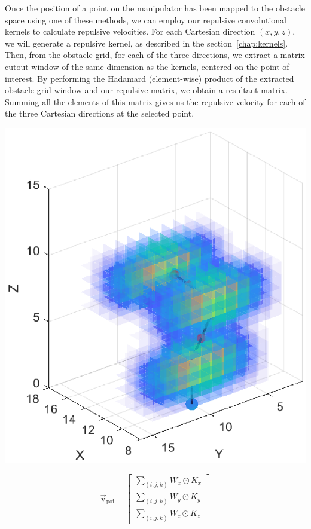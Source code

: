 \documentclass[]{article}
\begin{document}
Once the position of a point on the manipulator has been mapped to the obstacle space using one of these methods, we can employ our repulsive convolutional kernels to calculate repulsive velocities. For each Cartesian direction $(x, y, z)$, we will generate a repulsive kernel, as described in the section~\ref{chap:kernels}. Then, from the obstacle grid, for each of the three directions, we extract a matrix cutout window of the same dimension as the kernels, centered on the point of interest. By performing the Hadamard (element-wise) product of the extracted obstacle grid window and our repulsive matrix, we obtain a resultant matrix. Summing all the elements of this matrix gives us the repulsive velocity for each of the three Cartesian directions at the selected point.

\includegraphics[width=1\textwidth]{manipulator-kernels-visualization-grid-small.eps}


\begin{equation}
	\mathrm{\vec{v}_{poi}} = 
	\begin{bmatrix}
	\sum_{(i, j, k)} W_x \odot K_x \\
	\sum_{(i, j, k)} W_y \odot K_y \\
	\sum_{(i, j, k)} W_z \odot K_z	
	\end{bmatrix}
	\label{eq:poi_velocity}
\end{equation}
\end{document}
